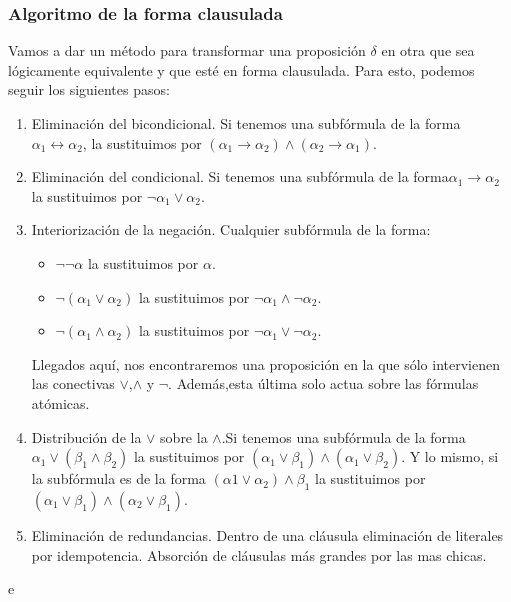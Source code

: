 \subsubsection{Algoritmo de la forma clausulada}
Vamos a dar un método para transformar una proposición $\delta$ en otra que sea lógicamente equivalente y que esté en forma clausulada. Para esto, podemos seguir los siguientes pasos:
\begin{enumerate}
    \item Eliminación del bicondicional. Si tenemos una subfórmula de la forma $\alpha_1 \leftrightarrow \alpha_2$, la sustituimos por $(\alpha_1 \rightarrow \alpha_2) \land (\alpha_2 \rightarrow \alpha_1)$.
    \item Eliminación del condicional. Si tenemos una subfórmula de la forma$\alpha_1 \rightarrow \alpha_2$ la sustituimos por $\neg\alpha_1 \lor \alpha_2$.
    \item Interiorización de la negación. Cualquier subfórmula de la forma:
          \begin{itemize}
              \item $\neg\neg \alpha$ la sustituimos por $\alpha$.
              \item $\neg (\alpha_1 \lor \alpha_2)$ la sustituimos por $\neg\alpha_1 \land \neg\alpha_2$.
              \item $\neg (\alpha_1 \land \alpha_2)$ la sustituimos por $\neg\alpha_1 \lor \neg\alpha_2$.
          \end{itemize}
          Llegados aquí, nos encontraremos una proposición en la que sólo intervienen las conectivas $\lor$,$\land$ y $\neg$. Además,esta última solo actua sobre las fórmulas atómicas.
    \item Distribución de la $\lor$ sobre la $\land$.Si tenemos una subfórmula de la forma $\alpha_1 \lor (\beta_1 \land \beta_2)$ la sustituimos por $(\alpha_1 \lor \beta_1) \land (\alpha_1 \lor \beta_2)$. Y lo mismo, si la subfórmula es de la forma $(\alpha1 \lor \alpha_2) \land \beta_1$ la sustituimos por $(\alpha_1 \lor \beta_1) \land (\alpha_2 \lor \beta_1)$.
    \item Eliminación de redundancias. Dentro de una cláusula eliminación de literales por idempotencia. Absorción de cláusulas más grandes por las mas chicas.
\end{enumerate}
\begin{ejemplo}
    e
\end{ejemplo}

